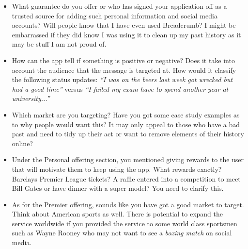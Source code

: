 	      \begin{itemize}
        \item What guarantee do you offer or who has signed your application off as a trusted source for adding such personal information and social media accounts? Will people know that I have even used Breadcrumb? I might be embarrassed if they did know I was using it to clean up my past history as it may be stuff I am not proud of.
        \item How can the app tell if something is positive or negative? Does it take into account the audience that the message is targeted at. How would it classify the following status updates: \emph{``I was on the beers last week got wrecked but had a good time''} versus \emph{``I failed my exam have to spend another year at university...''}
        \item Which market are you targeting? Have you got some case study examples as to why people would want this? It may only appeal to those who have a bad past and need to tidy up their act or want to remove elements of their history online?
        \item Under the Personal offering section, you mentioned giving rewards to the user that will motivate them to keep using the app. What rewards exactly? Barclays Premier League tickets? A raffle entered into a competition to meet Bill Gates or have dinner with a super model? You need to clarify this.
        \item As for the Premier offering, sounds like you have got a good market to target. Think about American sports as well. There is potential to expand the service worldwide if you provided the service to some world class sportsmen such as Wayne Rooney who may not want to see a \textit{boxing match} on social media.
      \end{itemize}
